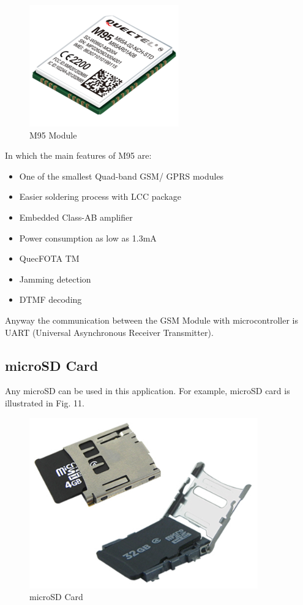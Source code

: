 \documentclass[10pt,journal,compsoc]{IEEEtran}
\begin{document}
\begin{enumerate}[\IEEEsetlabelwidth{2)}]
\begin{figure}[h]
  \centering
  \captionsetup{justification=centering}
  \includegraphics[scale=.45]{es9}
  \caption{M95 Module}
  \label{fig:fig10}
\end{figure}

\hfil

In which the main features of M95 are:

\begin{itemize}
  \item One of the smallest Quad-band GSM/ GPRS modules
  \item Easier soldering process with LCC package
  \item Embedded Class-AB amplifier
  \item Power consumption as low as 1.3mA
  \item QuecFOTA TM
  \item Jamming detection
  \item DTMF decoding
\end{itemize}

\end{enumerate}

\hfil

Anyway the communication between the GSM Module with microcontroller is UART (Universal Asynchronous Receiver Transmitter).

\hfil

\subsection{microSD Card}

Any microSD can be used in this application. For example, microSD card is illustrated in Fig. 11.

\begin{figure}[h]
  \centering
  \captionsetup{justification=centering}
  \includegraphics[scale=.45]{es10}
  \caption{microSD Card}
  \label{fig:fig11}
\end{figure}
\end{document}
